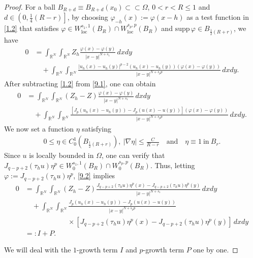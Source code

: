 \documentclass[reqno,10pt]{amsart}
\numberwithin{equation}{section}
\begin{document}
\begin{proof}
	For a ball $B_{R+d}\equiv B_{R+d}(x_0)\subset\subset\Omega$, $0<r<R\le1$ and $d\in\left(0,\frac{1}{4}(R-r) \right] $, by choosing $\varphi_{-h}(x):=\varphi(x-h)$ as a test function in \eqref{1.2} that satisfies $\varphi\in W^{s_1, 1}_{\mathrm{loc}}(B_R)\cap W^{s_p, p}_{\mathrm{loc}}(B_R)$ and $\mathrm{supp}\,\varphi\in B_{\frac{1}{2}(R+r)}$, we have
	\begin{align}
		\label{9.1}
		0&=\int_{\mathbb{R}^N}\int_{\mathbb{R}^N}Z_h\frac{\varphi(x)-\varphi(y)}{|x-y|^{N+s_1}}\,dxdy\nonumber\\
		&\quad+\int_{\mathbb{R}^N}\int_{\mathbb{R}^N}\frac{|u_h(x)-u_h(y)|^{p-2}(u_h(x)-u_h(y))(\varphi(x)-\varphi(y))}{|x-y|^{N+s_pp}}\,dxdy.
	\end{align}
	After subtracting \eqref{1.2} from \eqref{9.1}, one can obtain
	\begin{align}
		\label{9.2}
		0&=\int_{\mathbb{R}^N}\int_{\mathbb{R}^N}(Z_h-Z)\frac{\varphi(x)-\varphi(y)}{|x-y|^{N+s_1}}\,dxdy\nonumber\\
		&\quad+\int_{\mathbb{R}^N}\int_{\mathbb{R}^N}\frac{\left[ J_p(u_h(x)-u_h(y))-J_p(u(x)-u(y))\right] (\varphi(x)-\varphi(y))}{|x-y|^{N+s_pp}}\,dxdy.
	\end{align}
	We now set a function $\eta$ satisfying
	\begin{align}
		\label{eta}
		0\le\eta\in C^1_0\left( B_{\frac{1}{2}(R+r)}\right),\ |\nabla\eta|\le\frac{C}{R-r}\quad\text{and}\quad\eta\equiv1\ \text{in}\ B_r. 
	\end{align}
	Since $u$ is locally bounded in $\Omega$, one can verify that $J_{q-p+2}(\tau_hu)\eta^p\in W^{s_1,1}_{0}(B_R)\cap W^{s_p,p}_0(B_R)$. Thus, letting $\varphi:=J_{q-p+2}(\tau_hu)\eta^p$, \eqref{9.2} implies
	\begin{align}
		\label{9.3}
		0&=\int_{\mathbb{R}^N}\int_{\mathbb{R}^N}(Z_h-Z)\frac{J_{q-p+2}(\tau_hu)\eta^p(x)-J_{q-p+2}(\tau_hu)\eta^p(y)}{|x-y|^{N+s_1}}\,dxdy\nonumber\\
		&\quad+\int_{\mathbb{R}^N}\int_{\mathbb{R}^N}\frac{J_p(u_h(x)-u_h(y))-J_p(u(x)-u(y))}{|x-y|^{N+s_pp}}\nonumber\\
		&\qquad\qquad\qquad\times\left[ J_{q-p+2}(\tau_hu)\eta^p(x)-J_{q-p+2}(\tau_hu)\eta^p(y)\right]\,dxdy\nonumber\\
		&=:I+P.
	\end{align}
	
We will deal with the $1$-growth term $I$ and $p$-growth term $P$ one by one.
\smallskip	


\end{proof}
\end{document}
